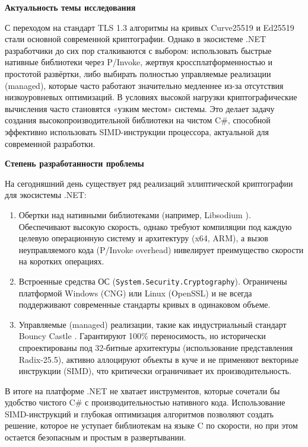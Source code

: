 \textbf{Актуальность темы исследования}

С переходом на стандарт TLS 1.3 алгоритмы на кривых Curve25519 и Ed25519 стали основной современной криптографии. Однако в экосистеме .NET разработчики до сих пор сталкиваются с выбором: использовать быстрые нативные библиотеки через P/Invoke, жертвуя кроссплатформенностью и простотой развёртки, либо выбирать полностью управляемые реализации (managed), которые часто работают значительно медленнее из-за отсутствия низкоуровневых оптимизаций. В условиях высокой нагрузки криптографические вычисления часто становятся «узким местом» системы. Это делает задачу создания высокопроизводительной библиотеки на чистом C#, способной эффективно использовать SIMD-инструкции процессора, актуальной для современной разработки.


\textbf{Степень разработанности проблемы}

На сегодняшний день существует ряд реализаций эллиптической криптографии для экосистемы .NET:

\begin{enumerate}
    \item Обертки над нативными библиотеками (например, Libsodium \cite{Libsodium}). Обеспечивают высокую скорость, однако требуют компиляции под каждую целевую операционную систему и архитектуру (x64, ARM), а вызов неуправляемого кода (P/Invoke overhead) нивелирует преимущество скорости на коротких операциях.
    \item Встроенные средства ОС (\texttt{System.Security.Cryptography}). Ограничены платформой Windows (CNG) или Linux (OpenSSL) и не всегда поддерживают современные стандарты кривых в одинаковом объеме.
    \item Управляемые (managed) реализации, такие как индустриальный стандарт Bouncy Castle \cite{BouncyCastle}. Гарантируют 100\% переносимость, но исторически спроектированы под 32-битные архитектуры (использование представления Radix-25.5), активно аллоцируют объекты в куче и не применяют векторные инструкции (SIMD), что критически ограничивает их производительность.
\end{enumerate}

В итоге на платформе .NET не хватает инструментов, которые сочетали бы удобство чистого C# с производительностью нативного кода. Использование SIMD-инструкций и глубокая оптимизация алгоритмов позволяют создать решение, которое не уступает библиотекам на языке C по скорости, но при этом остается безопасным и простым в развертывании.


